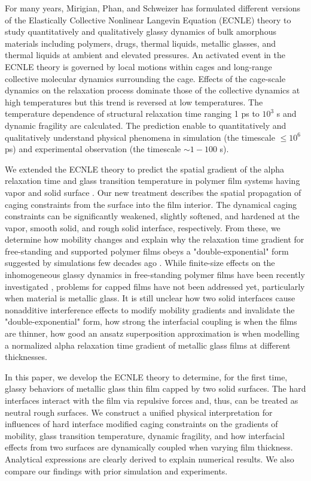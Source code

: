 \documentclass[twocolumn,preprintnumbers,amsmath,amssymb,superscriptaddress]{revtex4}
\begin{document}
For many years, Mirigian, Phan, and Schweizer has formulated different versions of the Elastically Collective Nonlinear Langevin Equation (ECNLE) theory \cite{2,7,10,6,35,42,11,61,62,44,45} to study quantitatively and qualitatively glassy dynamics of bulk amorphous materials including polymers, drugs, thermal liquids, metallic glasses, and thermal liquids at ambient and elevated pressures. An activated event in the ECNLE theory is governed by local motions within cages and long-range collective molecular dynamics surrounding the cage. Effects of the cage-scale dynamics on the relaxation process dominate those of the collective dynamics at high temperatures but this trend is reversed at low temperatures. The temperature dependence of structural relaxation time ranging 1 ps to $10^3$ s and dynamic fragility are calculated. The prediction enable to quantitatively and qualitatively understand physical phenomena in simulation (the timescale $\leq 10^6$ ps) and experimental observation (the timescale $\sim 1-100$ s).  

We extended the ECNLE theory to predict the spatial gradient of the alpha relaxation time and glass transition temperature in polymer film systems having vapor and solid surface \cite{3,4,8,24}. Our new treatment describes the spatial propagation of caging constraints from the surface into the film interior. The dynamical caging constraints can be significantly weakened, slightly softened, and hardened at the vapor, smooth solid, and rough solid interface, respectively. From these, we determine how mobility changes and explain why the relaxation time gradient for free-standing and supported polymer films obeys a "double-exponential" form suggested by simulations few decades ago \cite{17,15}. While finite-size effects on the inhomogeneous glassy dynamics in free-standing polymer films have been recently investigated \cite{24}, problems for capped films have not been addressed yet, particularly when material is metallic glass. It is still unclear how two solid interfaces cause nonadditive interference effects to modify mobility gradients and invalidate the "double-exponential" form, how strong the interfacial coupling is when the films are thinner, how good an ansatz superposition approximation \cite{17} is when modelling a normalized alpha relaxation time gradient of metallic glass films at different thicknesses.

In this paper, we develop the ECNLE theory to determine, for the first time, glassy behaviors of metallic glass thin film capped by two solid surfaces. The hard interfaces interact with the film via repulsive forces and, thus, can be treated as neutral rough surfaces. We construct a unified physical interpretation for influences of hard interface modified caging constraints on the gradients of mobility, glass transition temperature, dynamic fragility, and how interfacial effects from two surfaces are dynamically coupled when varying film thickness. Analytical expressions are clearly derived to explain numerical results. We also compare our findings with prior simulation and experiments.  
\end{document}
